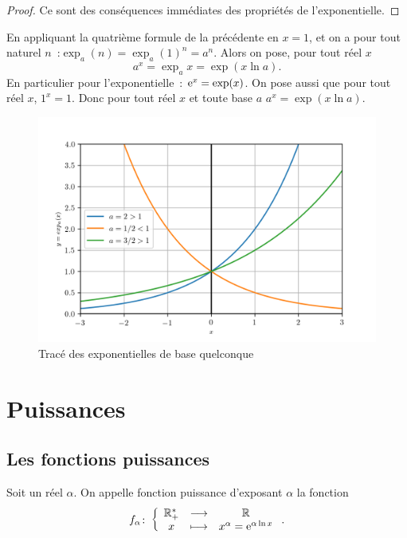 \begin{proof}
  Ce sont des conséquences immédiates des propriétés de l'exponentielle.
\end{proof}

En appliquant la quatrième formule de la précédente en \(x = 1\), et on a pour
tout naturel \(n\)~:\(\exp_a(n) = {\exp_a(1)}^n = a^n\). Alors on pose, pour
tout réel \(x\)
\begin{equation}
  a^x = \exp_a{x} = \exp{(x \ln{a})}.
\end{equation}
En particulier pour l'exponentielle~: \(\operatorname{e}^x = \exp(x)\). On pose aussi que pour
tout réel \(x\), \(1^x = 1\). Donc pour tout réel \(x\) et toute base \(a\)
\(a^x = \exp(x \ln a)\).

\begin{figure}
  \centering
  \includegraphics[scale = 0.7]{expa.png}
  \caption{Tracé des exponentielles de base quelconque}\label{fig:traceexpa}
\end{figure}

\section{Puissances}\label{sec:chap1-puissances}

\subsection{Les fonctions puissances}\label{subsec:chap1-fonctionspuissances}

\begin{defdef}
  Soit un réel \(\alpha\). On appelle fonction puissance d'exposant \(\alpha\)
  la fonction
  \begin{equation}
    f_{\alpha}\colon\left\{\begin{array}{ccc}\mathbb{R}_{+}^{*} & \longrightarrow &\mathbb{R}\\x & \longmapsto & x^{\alpha} = \operatorname{e}^{\alpha \ln x}\end{array}\right..
  \end{equation}
\end{defdef}

